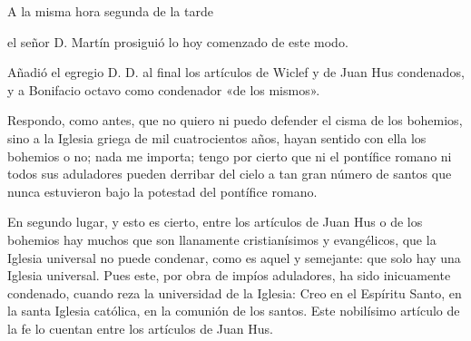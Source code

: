 A la misma hora segunda de la tarde

el señor D. Martín prosiguió lo hoy comenzado de este modo.

Añadió el egregio D. D. al final los artículos de Wiclef y de Juan Hus condenados, y a Bonifacio octavo como condenador «de los mismos».

Respondo, como antes, que no quiero ni puedo defender el cisma de los bohemios, sino a la Iglesia griega de mil cuatrocientos años, hayan sentido con ella los bohemios o no; nada me importa; tengo por cierto que ni el pontífice romano ni todos sus aduladores pueden derribar del cielo a tan gran número de santos que nunca estuvieron bajo la potestad del pontífice romano.

En segundo lugar, y esto es cierto, entre los artículos de Juan Hus o de los bohemios hay muchos que son llanamente cristianísimos y evangélicos, que la Iglesia universal no puede condenar, como es aquel y semejante: que solo hay una Iglesia universal. Pues este, por obra de impíos aduladores, ha sido inicuamente condenado, cuando reza la universidad de la Iglesia: Creo en el Espíritu Santo, en la santa Iglesia católica, en la comunión de los santos. Este nobilísimo artículo de la fe lo cuentan entre los artículos de Juan Hus.

